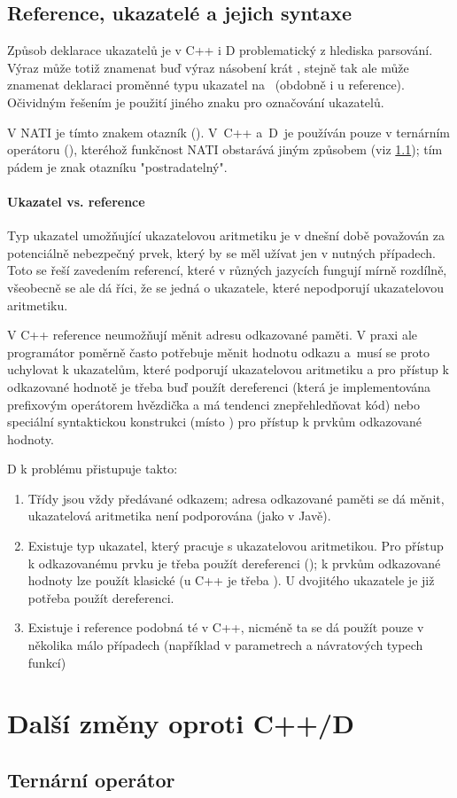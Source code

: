\subsection{Reference, ukazatelé a jejich syntaxe} \label{pointers}
Způsob deklarace ukazatelů je v C++ i D problematický z hlediska parsování. Výraz  může totiž znamenat buď výraz násobení  krát , stejně tak ale může znamenat deklaraci proměnné  typu ukazatel na ~(obdobně i u reference). Očividným řešením je použití jiného znaku pro označování ukazatelů.

V NATI je tímto znakem otazník (). V~C++ a~D~je používán pouze v ternárním operátoru (), kteréhož funkčnost NATI obstarává jiným způsobem (viz \ref{ternary}); tím pádem je znak otazníku "postradatelný".

\paragraph{Ukazatel vs. reference}
Typ ukazatel umožňující ukazatelovou aritmetiku je v dnešní době považován za potenciálně nebezpečný prvek, který by se měl užívat jen v nutných případech. Toto se řeší zavedením referencí, které v různých jazycích fungují mírně rozdílně, všeobecně se ale dá říci, že se jedná o ukazatele, které nepodporují ukazatelovou aritmetiku.

V C++ reference neumožňují měnit adresu odkazované paměti. V praxi ale programátor poměrně často potřebuje měnit hodnotu odkazu a~musí se proto uchylovat k ukazatelům, které podporují ukazatelovou aritmetiku a pro přístup k odkazované hodnotě je třeba buď použít dereferenci (která je implementována prefixovým operátorem hvězdička a má tendenci znepřehledňovat kód) nebo speciální syntaktickou konstrukci (místo  ) pro přístup k prvkům odkazované hodnoty.

D k problému přistupuje takto:
\begin{enumerate}
	\item Třídy jsou vždy předávané odkazem; adresa odkazované paměti se dá měnit, ukazatelová aritmetika není podporována (jako v Javě).
	\item Existuje typ ukazatel, který pracuje s ukazatelovou aritmetikou. Pro přístup k odkazovanému prvku je třeba použít dereferenci (); k prvkům odkazované hodnoty lze použít klasické  (u C++ je třeba ). U dvojitého ukazatele je již potřeba použít dereferenci.
	\item Existuje i reference podobná té v C++, nicméně ta se dá použít pouze v několika málo případech (například v parametrech a návratových typech funkcí)
\end{enumerate}

\section{Další změny oproti C++/D}

\subsection{Ternární operátor} \label{ternary}